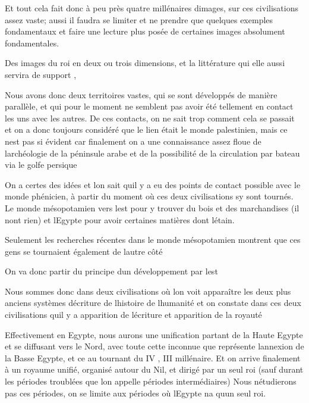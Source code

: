 \documentclass{article}
\begin{document}
Et tout cela fait donc à peu près quatre millénaires
d{\textquotesingle}images, sur ces civilisations assez vaste; aussi il
faudra se limiter et ne prendre que quelques exemples fondamentaux et
faire une lecture plus posée de certaines images absolument
fondamentales. 

Des  images du roi en deux ou trois dimensions, et la littérature qui
elle aussi servira de support , 

Nous avons donc deux territoires vastes, qui se sont développés de
manière parallèle, et qui pour le moment ne semblent pas avoir été
tellement en contact les uns avec les autres. De ces contacts, on ne
sait trop comment cela se passait et on a donc toujours considéré que
le lien était le monde palestinien, mais ce n{\textquotesingle}est pas
si évident car finalement on a une connaissance assez floue de
l{\textquotesingle}archéologie de la péninsule arabe et de la
possibilité de la circulation par bateau via le golfe persique

On a certes des idées et l{\textquotesingle}on sait
qu{\textquotesingle}il y a eu des points de contact possible avec le
monde phénicien, à partir du moment où ces deux civilisations
s{\textquotesingle}y sont tournés. Le monde mésopotamien vers
l{\textquotesingle}est pour y trouver du bois et des marchandises (il
n{\textquotesingle}ont rien) et l{\textquotesingle}Egypte pour avoir
certaines matières dont l{\textquotesingle}étain.

Seulement les recherches récentes dans le monde mésopotamien montrent
que ces gens se tournaient également de l{\textquotesingle}autre côté

On va donc partir du principe d{\textquotesingle}un développement par
l{\textquotesingle}est

Nous sommes donc dans deux civilisations où l{\textquotesingle}on voit
apparaître les deux plus anciens systèmes d{\textquotesingle}écriture
de l{\textquotesingle}histoire de l{\textquotesingle}humanité et on
constate dans ces deux civilisations  qu{\textquotesingle}il y a
apparition de l{\textquotesingle}écriture et apparition de la royauté

Effectivement en Egypte, nous aurons une unification partant de la Haute
Egypte et se diffusant vers le Nord, avec toute cette inconnue que
représente l{\textquotesingle}annexion de la Basse Egypte, et ce au
tournant du IV , III millénaire. Et on arrive finalement à un royaume
unifié, organisé autour du Nil, et dirigé par un seul roi (sauf durant
les périodes troublées que l{\textquotesingle}on appelle périodes
intermédiaires) Nous n{\textquotesingle}étudierons pas ces périodes, on
se limite aux périodes où l{\textquotesingle}Egypte
n{\textquotesingle}a qu{\textquotesingle}un seul roi.
\end{document}
